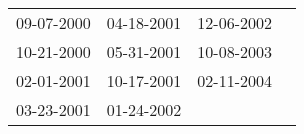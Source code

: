 \begin{supertabular}{llll}
 09-07-2000 &  04-18-2001 &  12-06-2002 \\
 10-21-2000 &  05-31-2001 &  10-08-2003 \\
 02-01-2001 &  10-17-2001 &  02-11-2004 \\
 03-23-2001 &  01-24-2002 &             \\
\end{supertabular}
